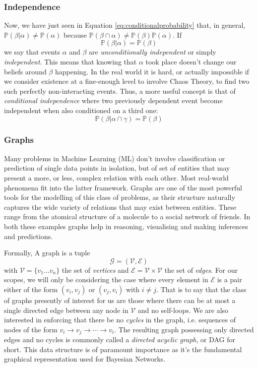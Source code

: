 \subsubsection{Independence}
Now, we have just seen in Equation \ref{eq:conditionalprobability} that, in general, $\mathbb{P}(\beta | \alpha) \neq \mathbb{P}(\alpha)$ because $\mathbb{P}(\beta \cap \alpha) \neq \mathbb{P}(\beta) \mathbb{P}(\alpha)$.
If 
\begin{equation}
	\mathbb{P}(\beta | \alpha) = \mathbb{P}(\beta)
\end{equation}
 we say that events $\alpha$ and $\beta$ are \textit{unconditionally independent} or simply \textit{independent}.
This means that knowing that $\alpha$ took place doesn't change our beliefs around $\beta$ happening. 
In the real world it is hard, or actually impossible if we consider existence at a fine-enough level to involve Chaos Theory, to find two such perfectly non-interacting events.
Thus, a more useful concept is that of \textit{conditional independence} where two previously dependent event become independent when also conditioned on a third one:
\begin{equation}
	\mathbb{P}(\beta | \alpha \cap \gamma ) = \mathbb{P}(\beta)
\end{equation}

\subsubsection{Graphs}
Many problems in Machine Learning (ML) don't involve classification or prediction of single data points in isolation, but of set of entities that may present a more, or less, complex relation with each other. 
Most real-world phenomena fit into the latter framework.
Graphs are one of the most powerful tools for the modelling of this class of problems, as their structure naturally captures the wide variety of relations that may exist between entities.
These range from the atomical structure of a molecule to a social network of friends.  
In both these examples graphs help in reasoning, visualising and making inferences and predictions.

Formally, A graph is a tuple 
\begin{equation}
	\mathcal{G} = (\mathcal{V}, \mathcal{E})
\end{equation}
with $\mathcal{V} = \{ v_1 \ldots v_n \}$ the set of \textit{vertices} and $\mathcal{E} = \mathcal{V} \times \mathcal{V}$ the set of \textit{edges}.
For our scopes, we will only be considering the case where every element in $\mathcal{E}$ is a pair either of the form $(v_i, v_j)$ or $(v_j, v_i)$ with $i \neq j$.  
That is to say that the class of graphs presently of interest for us are those where there can be at most a single directed edge between any node in $\mathcal{V}$ and no self-loops.
We are also interested in enforcing that there be no \textit{cycles} in the graph, i.e. sequences of nodes of the form $v_i \rightarrow v_j \rightarrow \cdots \rightarrow v_i$.
The resulting graph possessing only directed edges and no cycles is commonly called a \textit{directed acyclic graph}, or DAG for short.  
This data structure is of paramount importance as it's the fundamental graphical representation used for Bayesian Networks.

